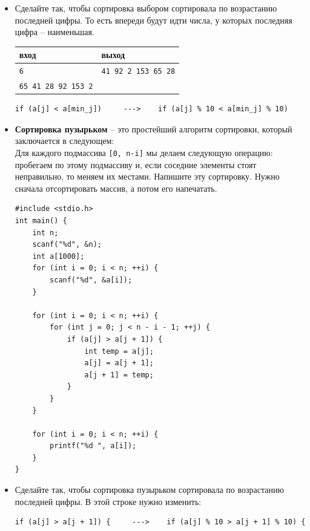 \documentclass{article}
\begin{document}
\begin{itemize}
\item Сделайте так, чтобы сортировка выбором сортировала по возрастанию последней цифры. То есть впереди будут идти числа, у которых последняя цифра -- наименьшая.
\begin{center}
\begin{tabular}{ l | l }
 вход & выход \\ \hline
 \texttt{6} & \texttt{41 92 2 153 65 28}  \\ 
 \texttt{65 41 28 92 153 2} &   \\ 
\end{tabular}
\end{center}

\begin{lstlisting}[backgroundcolor = \color{solcolor}]
if (a[j] < a[min_j])     --->    if (a[j] % 10 < a[min_j] % 10) 
\end{lstlisting}

\item \textbf{Сортировка пузырьком} -- это простейший алгоритм сортировки, который заключается в следующем: \\
Для каждого подмассива \texttt{[0, n-i]} мы делаем следующую операцию: пробегаем по этому подмассиву и, если соседние элементы стоят неправильно, то меняем их местами. Напишите эту сортировку. Нужно сначала отсортировать массив, а потом его напечатать.

\begin{lstlisting}[backgroundcolor = \color{solcolor}]
#include <stdio.h>
int main() {
    int n;
    scanf("%d", &n);
    int a[1000];
    for (int i = 0; i < n; ++i) {
        scanf("%d", &a[i]);
    }
    
    for (int i = 0; i < n; ++i) {
        for (int j = 0; j < n - i - 1; ++j) {
            if (a[j] > a[j + 1]) {
                int temp = a[j];
                a[j] = a[j + 1];
                a[j + 1] = temp;
            }
        }
    }

    for (int i = 0; i < n; ++i) {
        printf("%d ", a[i]);
    } 
}
\end{lstlisting}

\item Сделайте так, чтобы сортировка пузырьком сортировала по возрастанию последней цифры.
В этой строке нужно изменить:
\begin{lstlisting}[backgroundcolor = \color{solcolor}]
if (a[j] > a[j + 1]) {     --->    if (a[j] % 10 > a[j + 1] % 10) {
\end{lstlisting}
\end{itemize}
\end{document}
